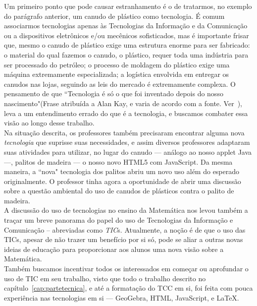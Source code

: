 Um primeiro ponto que pode causar estranhamento é o de tratarmos, no exemplo do parágrafo anterior, um canudo de plástico como tecnologia. É comum associarmos tecnologias apenas às Tecnologias da Informação e da Comunicação ou a dispositivos eletrônicos e/ou mecênicos sofisticados,
mas é importante frisar que, mesmo o canudo de plástico exige uma estrutura enorme para ser fabricado: o material do qual fazemos o canudo, o plástico, requer toda uma indústria para ser processado do petróleo; o processo de moldagem do plástico exige uma máquina extremamente especializada; a logística envolvida em entregar os canudos nas lojas, seguindo as leis do mercado é extremamente complexa. O pensamento de que ``Tecnologia é só o que foi inventado depois do nosso nascimento"(Frase atribuída a Alan Kay, e varia de acordo com a fonte. Ver~\cite[p. 23]{van2010gaming}), leva a um entendimento errado do que é a tecnologia, e buscamos combater essa visão ao longo desse trabalho.
\\


Na situação descrita, os professores também precisaram encontrar alguma nova \textit{tecnologia} que suprisse suas necessidades, e assim diversos professores adaptaram suas atividades para utilizar, no lugar do canudo --- análogo ao nosso applet Java ---, palitos de madeira --- o nosso novo HTML5 com JavaScript. Da mesma maneira, a ``nova" tecnologia dos palitos abriu um novo uso além do esperado originalmente. O professor tinha agora a oportunidade de abrir uma discussão sobre a questão ambiental do uso de canudos de plásticos contra o palito de madeira.
\\

A discussão do uso de tecnologias no ensino da Matemática nos levou também a traçar um breve panorama do papel do uso de Tecnologias da Informação e Comunicação -- abreviadas como  \textit{TIC}s. Atualmente, a noção é de que o uso das TICs, apesar de não trazer um benefício por si só, pode se aliar a outras novas ideias de educação para proporcionar aos alunos uma nova visão sobre a Matemática.
\\

Também buscamos incentivar todos os interessados em começar ou aprofundar o uso de TIC em seu trabalho, visto que todo o trabalho descrito no capítulo~\ref{cap:partetecnica}, e até a formatação do TCC em si, foi feita com pouca experiência nas tecnologias em si --- GeoGebra, HTML, JavaScript, e \LaTeX.
\\




